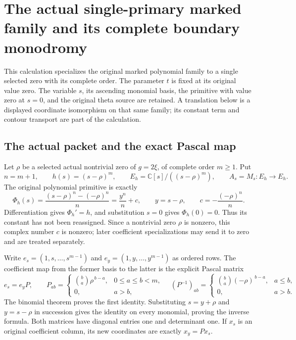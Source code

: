 \section{The actual single-primary marked family and its complete boundary monodromy}
\label{sec:sp-primary}

This calculation specializes the original marked polynomial family to a
single selected zero with its complete order. The parameter \(t\) is
fixed at its original value zero. The variable \(s\), its ascending
monomial basis, the primitive with value zero at \(s=0\), and the
original theta source are retained. A translation below is a displayed
coordinate isomorphism on that same family; its constant term and
contour transport are part of the calculation.

\subsection{The actual packet and the exact Pascal map}

Let \(\rho\) be a selected actual nontrivial zero of \(g=2\xi\), of
complete order \(m\ge1\). Put
\[
 n=m+1,\qquad h(s)=(s-\rho)^m,\qquad
 E_h=\mathbb C[s]/((s-\rho)^m),\qquad
 A_s=M_s:E_h\to E_h.
 \tag{SP.1}\label{eq:sp-packet}
\]
The original polynomial primitive is exactly
\[
 \Phi_h(s)=\frac{(s-\rho)^n-(-\rho)^n}{n}
       =\frac{y^n}{n}+c,\qquad
 y=s-\rho,\qquad c=-\frac{(-\rho)^n}{n}.
 \tag{SP.2}\label{eq:sp-phase}
\]
Differentiation gives \(\Phi_h'=h\), and substitution \(s=0\)
gives \(\Phi_h(0)=0\). Thus its constant has not been reassigned.
Since a nontrivial zero \(\rho\) is nonzero, this complex number
\(c\) is nonzero; later coefficient specializations may send it
to zero and are treated separately.

Write \(e_s=(1,s,\ldots,s^{m-1})\) and
\(e_y=(1,y,\ldots,y^{m-1})\) as ordered rows. The coefficient map
from the former basis to the latter is the explicit Pascal matrix
\[
 e_s=e_yP,\qquad
 P_{ab}=
 \begin{cases}\binom ba\rho^{\,b-a},&0\le a\le b<m,\\0,&a>b,\end{cases}
 \quad
 (P^{-1})_{ab}=
 \begin{cases}\binom ba(-\rho)^{\,b-a},&a\le b,\\0,&a>b.\end{cases}
 \tag{SP.3}\label{eq:sp-pascal}
\]
The binomial theorem proves the first identity. Substituting
\(s=y+\rho\) and \(y=s-\rho\) in succession gives the identity on
every monomial, proving the inverse formula. Both matrices have
diagonal entries one and determinant one. If \(x_s\) is an original
coefficient column, its new coordinates are exactly \(x_y=Px_s\).

